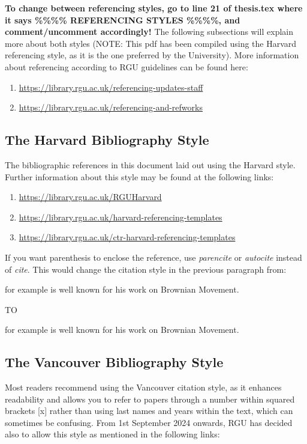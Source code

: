 \textbf{To change between referencing styles, go to line 21 of thesis.tex where it says \%\%\%\% REFERENCING STYLES \%\%\%\%, and comment/uncomment accordingly!} The following subsections will explain more about both styles (NOTE: This pdf has been compiled using the Harvard referencing style, as it is the one preferred by the University). More information about referencing according to RGU guidelines can be found here:

\begin{enumerate}
    \item \url{https://library.rgu.ac.uk/referencing-updates-staff}
    \item \url{https://library.rgu.ac.uk/referencing-and-refworks}
\end{enumerate}

\subsection{The Harvard Bibliography Style}

The bibliographic references in this document laid out using the Harvard style. Further information about this style may be found at the following links: 

\begin{enumerate}
    \item \url{https://library.rgu.ac.uk/RGUHarvard}
    \item \url{https://library.rgu.ac.uk/harvard-referencing-templates}
    \item \url{https://library.rgu.ac.uk/ctr-harvard-referencing-templates}
\end{enumerate}

If you want parenthesis to enclose the reference, use \textit{parencite} or \textit{autocite} instead of \textit{cite}. This would change the citation style in the previous paragraph from:

\cite{book:einsteinBrownianMovement} for example is well known for his work on Brownian Movement.

TO

\autocite{book:einsteinBrownianMovement} for example is well known for his work on Brownian Movement.

\subsection{The Vancouver Bibliography Style}

Most readers recommend using the Vancouver citation style, as it enhances readability and allows you to refer to papers through a number within squared brackets [x] rather than using last names and years within the text, which can sometimes be confusing. From 1st September 2024 onwards, RGU has decided also to allow this style as mentioned in the following links: 

